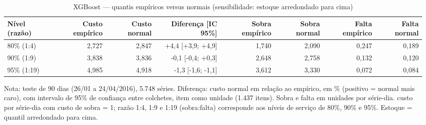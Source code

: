 \begin{table}[htbp]
\centering
\small
\caption{XGBoost — quantis empíricos versus normais (sensibilidade: estoque arredondado para cima)}
\label{tab:xgb_empirico_vs_normal_sensibilidade}
\begin{tabular}{lrrrrrrr}
\toprule
Nível (razão) & Custo empírico & Custo normal & Diferença [IC 95\%] & Sobra empírico & Sobra normal & Falta empírico & Falta normal \\
\midrule
80\% (1:4) & 2,727 & 2,847 & +4,4 [+3,9; +4,9] & 1,740 & 2,090 & 0,247 & 0,189 \\
90\% (1:9) & 3,838 & 3,836 & -0,1 [-0,4; +0,3] & 2,648 & 2,758 & 0,132 & 0,120 \\
95\% (1:19) & 4,985 & 4,918 & -1,3 [-1,6; -1,1] & 3,612 & 3,330 & 0,072 & 0,084 \\
\bottomrule
\end{tabular}
\par\smallskip
{\footnotesize Nota: teste de 90 dias (26/01 a 24/04/2016), 5.748 séries. Diferença: custo normal em relação ao empírico, em \% (positivo = normal mais caro), com intervalo de 95\% de confiança entre colchetes, item como unidade (1.437 itens). Sobra e falta em unidades por série-dia. custo por série-dia com custo de sobra = 1; razão 1:4, 1:9 e 1:19 (sobra:falta) corresponde aos níveis de serviço de 80\%, 90\% e 95\%. Estoque = quantil arredondado para cima.}
\end{table}
